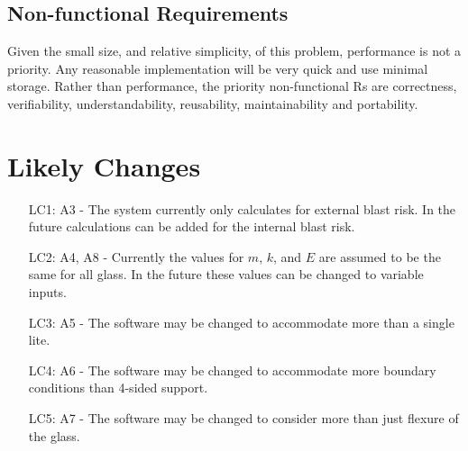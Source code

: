 \documentclass[12pt]{article}
\begin{document}
\subsection{Non-functional Requirements}
\label{Sec:NR}
Given the small size, and relative simplicity, of this problem, performance is not a priority. Any reasonable implementation will be very quick and use minimal storage. Rather than performance, the priority non-functional Rs are correctness, verifiability, understandability, reusability, maintainability and portability.
\section{Likely Changes}
\label{Sec:LC}
\begin{itemize}
\item[LC1:]A3 - The system currently only calculates for external blast risk. In the future calculations can be added for the internal blast risk.
\item[LC2:]A4, A8 - Currently the values for $m$, $k$, and $E$ are assumed to be the same for all glass. In the future these values can be changed to variable inputs.
\item[LC3:]A5 - The software may be changed to accommodate more than a single lite.
\item[LC4:]A6 - The software may be changed to accommodate more boundary conditions than 4-sided support.
\item[LC5:]A7 - The software may be changed to consider more than just flexure of the glass.
\end{itemize}
\end{document}

